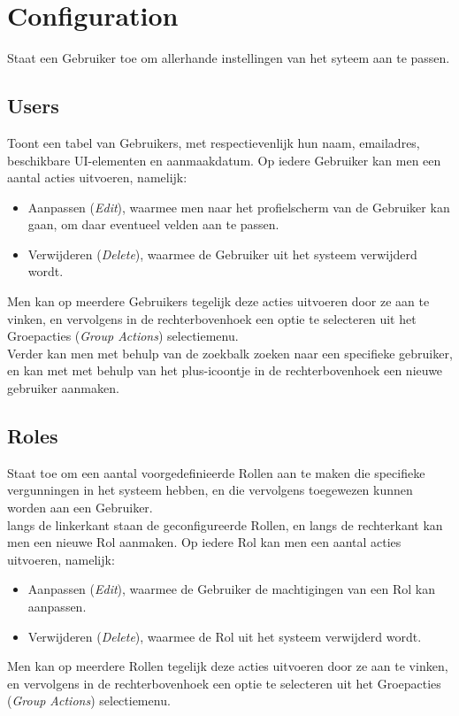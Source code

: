 \documentclass[]{memoir}
\begin{document}
\section{Configuration}
Staat een Gebruiker toe om allerhande instellingen van het syteem aan te passen.
\subsection{Users}
Toont een tabel van Gebruikers, met respectievenlijk hun naam, emailadres, beschikbare UI-elementen en aanmaakdatum. 
Op iedere Gebruiker kan men een aantal acties uitvoeren, namelijk:
\begin{itemize}
	\item Aanpassen (\textsl{Edit}), waarmee men naar het profielscherm van de Gebruiker kan gaan, om daar eventueel velden aan te passen.
	\item Verwijderen (\textsl{Delete}), waarmee de Gebruiker uit het systeem verwijderd wordt.
\end{itemize}
Men kan op meerdere Gebruikers tegelijk deze acties uitvoeren door ze aan te vinken, en vervolgens in de rechterbovenhoek een optie te selecteren uit het Groepacties  (\textsl{Group Actions}) selectiemenu.\\
Verder kan men met behulp van de zoekbalk zoeken naar een specifieke gebruiker, en kan met met behulp van het plus-icoontje in de rechterbovenhoek een nieuwe gebruiker aanmaken.

\subsection{Roles}
Staat toe om een aantal voorgedefinieerde Rollen aan te maken die specifieke vergunningen in het systeem hebben, en die vervolgens toegewezen kunnen worden aan een Gebruiker.\\
langs de linkerkant staan de geconfigureerde Rollen, en langs de rechterkant kan men een nieuwe Rol aanmaken. 
Op iedere Rol kan men een aantal acties uitvoeren, namelijk:
\begin{itemize}
	\item Aanpassen (\textsl{Edit}), waarmee de Gebruiker de machtigingen van een Rol kan aanpassen.
	\item Verwijderen (\textsl{Delete}), waarmee de Rol uit het systeem verwijderd wordt.
\end{itemize}
Men kan op meerdere Rollen tegelijk deze acties uitvoeren door ze aan te vinken, en vervolgens in de rechterbovenhoek een optie te selecteren uit het Groepacties  (\textsl{Group Actions}) selectiemenu.\\
\end{document}
